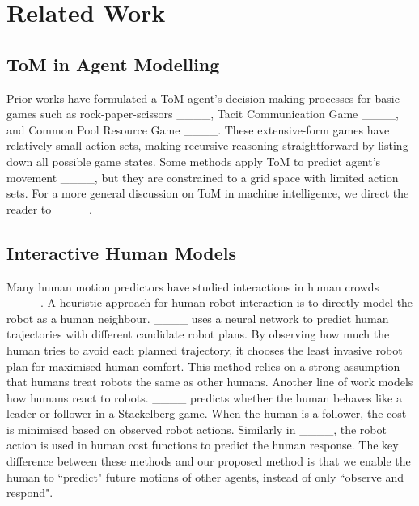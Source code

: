 \section{Related Work}

\subsection{ToM in Agent Modelling}
\label{sec:ToM}
Prior works have formulated a ToM agent's decision-making processes for basic games such as rock-paper-scissors ____, Tacit Communication Game ____, and Common Pool Resource Game ____. 
These extensive-form games have relatively small action sets, making recursive reasoning straightforward by listing down all possible game states. Some methods apply ToM to predict agent's movement ____, but they are constrained to a grid space with limited action sets. For a more general discussion on ToM in machine intelligence, we direct the reader to ____.

\subsection{Interactive Human Models}
Many human motion predictors have studied interactions in human crowds ____. A heuristic approach for human-robot interaction is to directly model the robot as a human neighbour. 
____ uses a neural network to predict human trajectories with different candidate robot plans. By observing how much the human tries to avoid each planned trajectory, it chooses the least invasive robot plan for maximised human comfort. 
This method relies on a strong assumption that humans treat robots the same as other humans. 
Another line of work models how humans react to robots. ____ predicts whether the human behaves like a leader or follower in a Stackelberg game. When the human is a follower, the cost is minimised based on observed robot actions. 
Similarly in ____, the robot action is used in human cost functions to predict the human response. The key difference between these methods and our proposed method is that we enable the human to ``predict" future motions of other agents, instead of only ``observe and respond".

